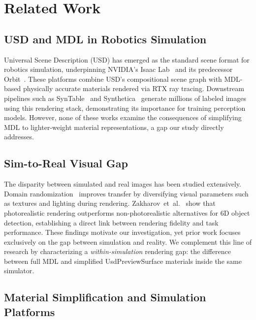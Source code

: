 \section{Related Work}
\label{sec:related_work}

\subsection{USD and MDL in Robotics Simulation}

Universal Scene Description (USD) has emerged as the standard scene format for
robotics simulation, underpinning NVIDIA's Isaac
Lab~\cite{Mittal2025Isaac} and its predecessor
Orbit~\cite{Mittal2023Orbit}. These platforms combine USD's compositional scene
graph with MDL-based physically accurate materials rendered via RTX ray tracing.
Downstream pipelines such as SynTable~\cite{Ng2023SynTable} and
Synthetica~\cite{Singh2024Synthetica} generate millions of labeled images using
this rendering stack, demonstrating its importance for training perception
models. However, none of these works examine the consequences of simplifying
MDL to lighter-weight material representations, a gap our study directly
addresses.

\subsection{Sim-to-Real Visual Gap}

The disparity between simulated and real images has been studied extensively.
Domain randomization~\cite{Tobin2017Domain,Tremblay2018Training} improves
transfer by diversifying visual parameters such as textures and lighting during
rendering. Zakharov~et~al.~\cite{Zakharov2022Photo} show that photorealistic
rendering outperforms non-photorealistic alternatives for 6D object detection,
establishing a direct link between rendering fidelity and task performance.
These findings motivate our investigation, yet prior work focuses exclusively
on the gap between simulation and reality. We complement this line of research
by characterizing a \emph{within-simulation} rendering gap: the difference
between full MDL and simplified UsdPreviewSurface materials inside the same
simulator.

\subsection{Material Simplification and Simulation Platforms}

